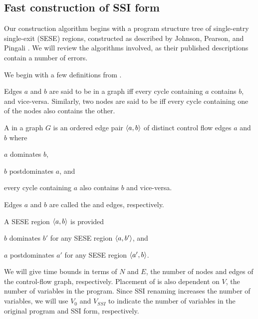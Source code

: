 \documentclass[12pt,titlepage]{article}
\begin{document}
\subsection{Fast construction of SSI form}
Our construction algorithm begins with a program structure tree of
single-entry single-exit (SESE) regions, constructed as described by
Johnson, Pearson, and Pingali \cite{johnson94:pst}.  We will review
the algorithms involved, as their published descriptions
\cite{johnson93:sese} contain a number of errors.

We begin with a few definitions from \cite{johnson94:pst}.
\begin{definition}
Edges $a$ and $b$ are said to be  in a
graph iff every cycle containing $a$ contains $b$, and vice-versa.
Similarly, two nodes are said to be  iff
every cycle containing one of the nodes also contains the other.
\end{definition}
\begin{definition}
A  in a graph $G$ is an ordered edge pair
$\left\langle a,b \right\rangle$ of distinct control flow edges $a$ and $b$ where
\begin{tightenum}
\item $a$ dominates $b$,
\item $b$ postdominates $a$, and
\item every cycle containing $a$ also contains $b$ and vice-versa.
\end{tightenum}
Edges $a$ and $b$ are called the  and  edges,
respectively.
\end{definition}
\begin{definition}
A SESE region $\left\langle a,b \right\rangle$ is  provided
\begin{tightenum}
\item $b$ dominates $b'$ for any SESE region $\left\langle a,b' \right\rangle$, and
\item $a$ postdominates $a'$ for any SESE region $\left\langle a',b \right\rangle$.
\end{tightenum}
\end{definition}

We will give time bounds in terms of $N$ and $E$, the number of nodes
and edges of the control-flow graph, respectively.
Placement of 
is also dependent on $V$, the number of variables in the program.
Since SSI renaming increases the number of variables, we will use
$V_0$ and $V_{SSI}$ to indicate the number of variables in the
original program and SSI form, respectively.
\end{document}
